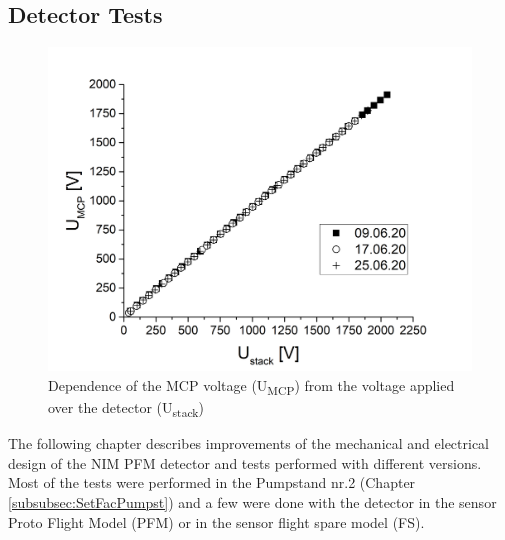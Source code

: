 	\subsection{Detector Tests }
	
	\begin{figure}[h]
		\centering
		\includegraphics[width=.7\textwidth]{Experiments/PFM_UstackUmccp_TimeEvol.png}
		\caption{Dependence of the MCP voltage (U\textsubscript{MCP}) from the voltage applied over the detector (U\textsubscript{stack})}
		\label{fig:PFMUstackUmcpTimeEvol}
	\end{figure}
	
	The following chapter describes improvements of the mechanical and electrical design of the NIM PFM detector and tests performed with different versions. Most of the tests were performed in the Pumpstand nr.2 (Chapter \ref{subsubsec:SetFacPumpst}) and a few were done with the detector in the sensor Proto Flight Model (PFM) or in the sensor flight spare model (FS).\\
	
